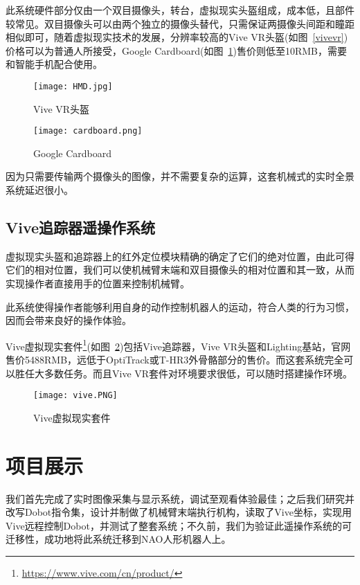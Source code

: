 此系统硬件部分仅由一个双目摄像头，转台，虚拟现实头盔组成，成本低，且部件较常见。双目摄像头可以由两个独立的摄像头替代，只需保证两摄像头间距和瞳距相似即可，随着虚拟现实技术的发展，分辨率较高的Vive VR头盔(如图~\ref{vivevr})价格可以为普通人所接受，Google Cardboard(如图~\ref{card})售价则低至10RMB，需要和智能手机配合使用。
\begin{figure}
\begin{minipage}{0.48\textwidth}
  \centering
  \texttt{[image: HMD.jpg]}
  \caption{Vive VR头盔}
  \label{vivevr}
\end{minipage}\hfill
\begin{minipage}{0.48\textwidth}
  \centering
  \texttt{[image: cardboard.png]}
  \caption{Google Cardboard}
  \label{card}
\end{minipage}
\end{figure}

因为只需要传输两个摄像头的图像，并不需要复杂的运算，这套机械式的实时全景系统延迟很小。

\section{Vive追踪器遥操作系统}

虚拟现实头盔和追踪器上的红外定位模块精确的确定了它们的绝对位置，由此可得它们的相对位置，我们可以使机械臂末端和双目摄像头的相对位置和其一致，从而实现操作者直接用手的位置来控制机械臂。

此系统使得操作者能够利用自身的动作控制机器人的运动，符合人类的行为习惯，因而会带来良好的操作体验。

Vive虚拟现实套件\footnote{\url{https://www.vive.com/cn/product/}}(如图~\ref{vivekit})包括Vive追踪器，Vive VR头盔和Lighting基站，官网售价5488RMB，远低于OptiTrack或T-HR3外骨骼部分的售价。而这套系统完全可以胜任大多数任务。而且Vive VR套件对环境要求很低，可以随时搭建操作环境。
\begin{figure}[H]
\small
\centering
\texttt{[image: vive.PNG]}
\caption{Vive虚拟现实套件} 
\label{vivekit}
\end{figure}

\chapter{项目展示}

我们首先完成了实时图像采集与显示系统，调试至观看体验最佳；之后我们研究并改写Dobot指令集，设计并制做了机械臂末端执行机构，读取了Vive坐标，实现用Vive远程控制Dobot，并测试了整套系统；不久前，我们为验证此遥操作系统的可迁移性，成功地将此系统迁移到NAO人形机器人上。

